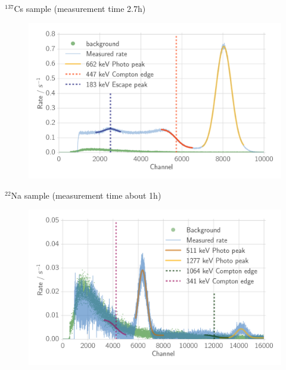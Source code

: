 \documentclass[xcolor=x11names,compress]{beamer}
\renewcommand{\(}{\begin{columns}}
\renewcommand{\)}{\end{columns}}
\newcommand{\<}[1]{\begin{column}{#1}}
\renewcommand{\>}{\end{column}}
\begin{document}
\begin{frame}[t]{$^{137}$Cs sample (measurement time 2.7h)}
 \begin{figure}[htpb]
    \centering
    \includegraphics[width=1.0\linewidth]{../analysis/figures/histo_na_137cs}
    \label{fig:histo_na_137cs}
\end{figure}
\end{frame}


\begin{frame}[t]{$^{22}$Na sample (measurement time about 1h) }
\begin{figure}[htpb]
    \centering
    \includegraphics[width=1.0\linewidth]{../analysis/figures/histo_na_22na}
\label{fig:histo_na_22na}
\end{figure}
\end{frame}
\end{document}
